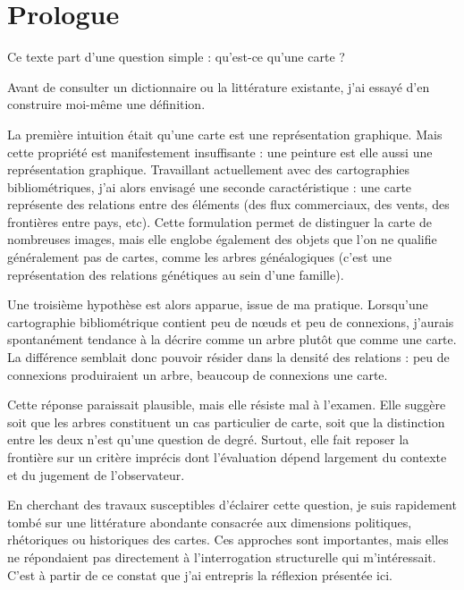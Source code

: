 \section*{Prologue}


Ce texte part d'une question simple : qu'est-ce qu'une carte ?

Avant de consulter un dictionnaire ou la littérature existante, j'ai essayé d'en construire moi-même une définition.

La première intuition était qu'une carte est une représentation graphique. Mais cette propriété est manifestement insuffisante : une peinture est elle aussi une représentation graphique. Travaillant actuellement avec des cartographies bibliométriques, j'ai alors envisagé une seconde caractéristique : une carte représente des relations entre des éléments (des flux commerciaux, des vents, des frontières entre pays, etc). Cette formulation permet de distinguer la carte de nombreuses images, mais elle englobe également des objets que l'on ne qualifie généralement pas de cartes, comme les arbres généalogiques (c'est une représentation des relations génétiques au sein d'une famille).

Une troisième hypothèse est alors apparue, issue de ma pratique. Lorsqu'une cartographie bibliométrique contient peu de n\oe{}uds et peu de connexions, j'aurais spontanément tendance à la décrire comme un arbre plutôt que comme une carte. La différence semblait donc pouvoir résider dans la densité des relations : peu de connexions produiraient un arbre, beaucoup de connexions une carte.

Cette réponse paraissait plausible, mais elle résiste mal à l'examen. Elle suggère soit que les arbres constituent un cas particulier de carte, soit que la distinction entre les deux n'est qu'une question de degré. Surtout, elle fait reposer la frontière sur un critère imprécis dont l'évaluation dépend largement du contexte et du jugement de l'observateur.

En cherchant des travaux susceptibles d'éclairer cette question, je suis rapidement tombé sur une littérature abondante consacrée aux dimensions politiques, rhétoriques ou historiques des cartes. Ces approches sont importantes, mais elles ne répondaient pas directement à l'interrogation structurelle qui m'intéressait. C'est à partir de ce constat que j'ai entrepris la réflexion présentée ici.

